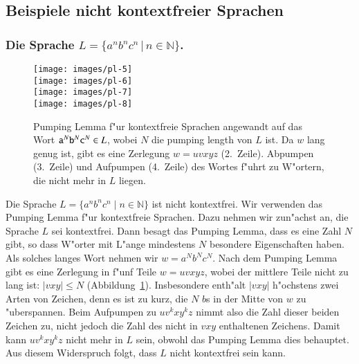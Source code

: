 \subsection{Beispiele nicht kontextfreier Sprachen}
\subsubsection{Die Sprache $L=\{a^nb^nc^n\,|\,n\in\mathbb N\}$.}
\begin{figure}
\begin{center}
\texttt{[image: images/pl-5]}\\%
\smallskip
\texttt{[image: images/pl-6]}\\%
\smallskip
\texttt{[image: images/pl-7]}\\%
\smallskip
\texttt{[image: images/pl-8]}%
\end{center}
\caption{Pumping Lemma f"ur kontextfreie Sprachen angewandt auf das 
Wort ${\tt a}^N{\tt b}^N{\tt c }^N\in L$, wobei $N$ die pumping length
von $L$ ist. Da $w$ lang genug ist, gibt es eine Zerlegung 
$w=uvxyz$ (2.~Zeile).
Abpumpen (3.~Zeile) und Aufpumpen (4.~Zeile) des
Wortes f"uhrt zu W"ortern, die nicht mehr in $L$ liegen.\label{pumpingcfgimage}}
\end{figure}

Die Sprache $L=\{a^nb^nc^n\;|\;n\in\mathbb N\}$ ist nicht kontextfrei.
Wir verwenden das Pumping Lemma f"ur kontextfreie Sprachen.  Dazu
nehmen wir zun"achst an, die Sprache $L$ sei kontextfrei. Dann
besagt das Pumping Lemma, dass es eine Zahl $N$ gibt, so dass
W"orter mit L"ange mindestens $N$ besondere Eigenschaften haben.
Als solches langes Wort nehmen wir $w=a^Nb^Nc^N$. Nach dem
Pumping Lemma gibt es eine Zerlegung in f"unf Teile
$w=uvxyz$, wobei der mittlere Teile nicht zu lang ist:
$|vxy|\le N$ (Abbildung~\ref{pumpingcfgimage}).
Insbesondere enth"alt $|vxy|$ h"ochstens zwei
Arten von Zeichen, denn es ist zu kurz, die $N$ $b$s in der Mitte
von $w$ zu "uberspannen. Beim Aufpumpen zu $uv^kxy^kz$ nimmt also
die Zahl dieser beiden Zeichen zu, nicht jedoch die Zahl des nicht
in $vxy$ enthaltenen Zeichens.
Damit kann $uv^kxy^kz$ nicht mehr in $L$ sein, obwohl das
Pumping Lemma dies behauptet. Aus diesem Widerspruch folgt,
dass $L$ nicht kontextfrei sein kann.


